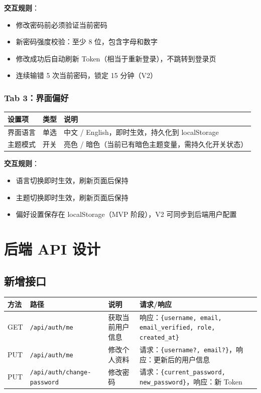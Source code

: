 \documentclass[11pt,a4paper]{article}
\begin{document}
\textbf{交互规则}：
\begin{itemize}[nosep]
  \item 修改密码前必须验证当前密码
  \item 新密码强度校验：至少 8 位，包含字母和数字
  \item 修改成功后自动刷新 Token（相当于重新登录），不跳转到登录页
  \item 连续输错 5 次当前密码，锁定 15 分钟（V2）
\end{itemize}

\subsubsection{Tab 3：界面偏好}

\begin{table}[h]
\centering
\small
\begin{tabular}{llp{5cm}}
\toprule
\textbf{设置项} & \textbf{类型} & \textbf{说明} \\
\midrule
界面语言 & 单选 & 中文 / English，即时生效，持久化到 localStorage \\
主题模式 & 开关 & 亮色 / 暗色（当前已有暗色主题变量，需持久化开关状态） \\
\bottomrule
\end{tabular}
\end{table}

\textbf{交互规则}：
\begin{itemize}[nosep]
  \item 语言切换即时生效，刷新页面后保持
  \item 主题切换即时生效，刷新页面后保持
  \item 偏好设置保存在 localStorage（MVP 阶段），V2 可同步到后端用户配置
\end{itemize}

\section{后端 API 设计}

\subsection{新增接口}

\begin{table}[h]
\centering
\small
\begin{tabular}{llp{4cm}p{4cm}}
\toprule
\textbf{方法} & \textbf{路径} & \textbf{说明} & \textbf{请求/响应} \\
\midrule
GET & \texttt{/api/auth/me} & 获取当前用户信息 & 响应：\texttt{\{username, email, email\_verified, role, created\_at\}} \\
PUT & \texttt{/api/auth/me} & 修改个人资料 & 请求：\texttt{\{username?, email?\}}，响应：更新后的用户信息 \\
PUT & \texttt{/api/auth/change-password} & 修改密码 & 请求：\texttt{\{current\_password, new\_password\}}，响应：新 Token \\
\bottomrule
\end{tabular}
\end{table}
\end{document}
